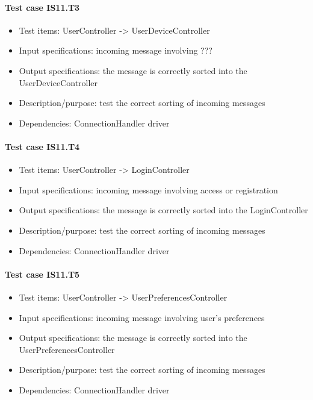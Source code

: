 \documentclass[a4paper,leqno]{article}
\begin{document}
\paragraph{Test case IS11.T3}
\begin{itemize}
	\item Test items: UserController -> UserDeviceController
	\item Input specifications: incoming message involving ???
	\item Output specifications: the message is correctly sorted into the UserDeviceController
	\item Description/purpose: test the correct sorting of incoming messages
	\item Dependencies: ConnectionHandler driver 
\end{itemize}

\paragraph{Test case IS11.T4}
\begin{itemize}
	\item Test items: UserController -> LoginController
	\item Input specifications: incoming message involving access or registration
	\item Output specifications: the message is correctly sorted into the LoginController
	\item Description/purpose: test the correct sorting of incoming messages
	\item Dependencies: ConnectionHandler driver
\end{itemize}

\paragraph{Test case IS11.T5}
\begin{itemize}
	\item Test items: UserController -> UserPreferencesController
	\item Input specifications: incoming message involving user's preferences
	\item Output specifications: the message is correctly sorted into the UserPreferencesController
\item Description/purpose: test the correct sorting of incoming messages
\item Dependencies: ConnectionHandler driver 
\end{itemize}
\end{document}
